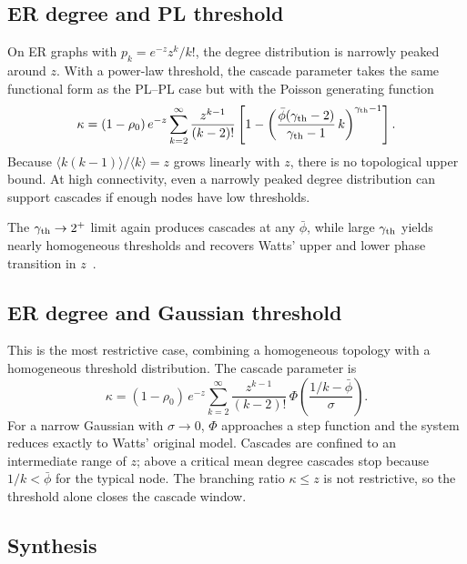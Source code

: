 \documentclass[]{revtex4-2}
\begin{document}
\subsection{ER degree and PL threshold}
\label{sec:er-pl}

On ER graphs with $p_k = e^{-z}z^k/k!$, the degree distribution is narrowly peaked around $z$. With a power-law threshold, the cascade parameter takes the same functional form as the PL--PL case but with the Poisson generating function
\begin{equation}
    \kappa = (1-\rho_0)\,e^{-z}\sum_{k=2}^\infty \frac{z^{k-1}}{(k-2)!}
    \left[1 - \left(\frac{\bar\phi(\gamma_{\rm th}-2)}{\gamma_{\rm th}-1}\,k\right)^{\gamma_{\rm th}-1}\right] .
\end{equation}
Because $\langle k(k-1)\rangle/\langle k\rangle = z$ grows linearly with $z$, there is no topological upper bound. At high connectivity, even a narrowly peaked degree distribution can support cascades if enough nodes have low thresholds.

The $\gamma_{\rm th}\to2^+$ limit again produces cascades at any $\bar\phi$, while large $\gamma_{\rm th}$ yields nearly homogeneous thresholds and recovers Watts' upper and lower phase transition in $z$~\citep{Watts2002}.

\subsection{ER degree and Gaussian threshold}
\label{sec:er-gauss}

This is the most restrictive case, combining a homogeneous topology with a homogeneous threshold distribution. The cascade parameter is
\begin{equation}
    \kappa = (1-\rho_0)\,e^{-z}\sum_{k=2}^\infty \frac{z^{k-1}}{(k-2)!}\,
    \Phi\!\left(\frac{1/k-\bar\phi}{\sigma}\right).
\end{equation}
For a narrow Gaussian with $\sigma\to0$, $\Phi$ approaches a step function and the system reduces exactly to Watts' original model. Cascades are confined to an intermediate range of $z$; above a critical mean degree cascades stop because $1/k < \bar\phi$ for the typical node. The branching ratio $\kappa\le z$ is not restrictive, so the threshold alone closes the cascade window.

\subsection{Synthesis}
\end{document}

